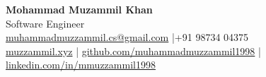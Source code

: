 \documentclass[a4paper,10pt]{article}
\begin{document}

\begin{center}
  {\LARGE\bfseries Mohammad Muzammil Khan}\\[2pt]
  {\normalsize Software Engineer}\\[4pt]
  \href{mailto:muhammadmuzzammil.cs@gmail.com}{muhammadmuzzammil.cs@gmail.com}
  \quad|\quad +91 98734 04375\\
  \href{https://muzzammil.xyz}{muzzammil.xyz}
  \quad|\quad
  \href{https://github.com/muhammadmuzzammil1998}{github.com/muhammadmuzzammil1998}
  \quad|\quad
  \href{https://linkedin.com/in/mmuzzammil1998}{linkedin.com/in/mmuzzammil1998}
\end{center}
\vspace{-4pt}






\end{document}
